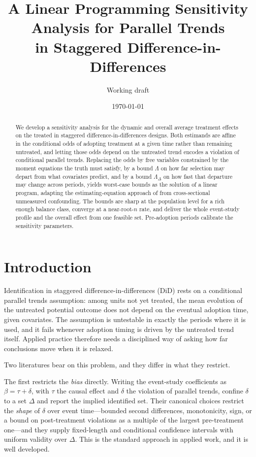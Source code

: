 \documentclass[12pt]{article}
\title{\bf A Linear Programming Sensitivity Analysis for Parallel Trends\\
in Staggered Difference-in-Differences}
\author{Working draft}
\date{\today}
\theoremstyle{remark}
\begin{document}
\maketitle

\begin{abstract}
We develop a sensitivity analysis for the dynamic and overall average treatment effects on
the treated in staggered difference-in-differences designs. Both estimands are affine in
the conditional odds of adopting treatment at a given time rather than remaining untreated,
and letting those odds depend on the untreated trend encodes a violation of conditional
parallel trends. Replacing the odds by free variables constrained by the moment equations
the truth must satisfy, by a bound $\Lambda$ on how far selection may depart from what
covariates predict, and by a bound $\Lambda_\Delta$ on how fast that departure may change
across periods, yields worst-case bounds as the solution of a linear program, adapting the
estimating-equation approach of \citet{tang2025simple} from cross-sectional unmeasured
confounding. The bounds are sharp at the population level for a rich enough balance class,
converge at a near-root-$n$ rate, and deliver the whole event-study profile and the overall
effect from one feasible set. Pre-adoption periods calibrate the sensitivity parameters.
\end{abstract}

\section{Introduction}
\label{sec:intro}

Identification in staggered difference-in-differences (DiD) rests on a conditional
parallel trends assumption: among units not yet treated, the mean evolution of the
untreated potential outcome does not depend on the eventual adoption time, given
covariates. The assumption is untestable in exactly the periods where it is used, and it
fails whenever adoption timing is driven by the untreated trend itself. Applied practice
therefore needs a disciplined way of asking how far conclusions move when it is relaxed.

Two literatures bear on this problem, and they differ in what they restrict.

The first restricts the \emph{bias} directly. Writing the event-study coefficients as
$\beta = \tau + \delta$, with $\tau$ the causal effect and $\delta$ the violation of
parallel trends, \citet{rambachan2023honest} confine $\delta$ to a set $\Delta$ and report
the implied identified set. Their canonical choices restrict the \emph{shape} of $\delta$
over event time---bounded second differences, monotonicity, sign, or a bound on
post-treatment violations as a multiple of the largest pre-treatment one---and they supply
fixed-length and conditional confidence intervals with uniform validity over $\Delta$.
This is the standard approach in applied work, and it is well developed.
\end{document}
